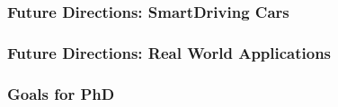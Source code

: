 \documentclass{beamer}
\begin{document}

\begin{frame}
  \frametitle{Future Directions: SmartDriving Cars}
\end{frame}



\begin{frame}
  \frametitle{Future Directions: Real World Applications}
\end{frame}



\begin{frame}
  \frametitle{Goals for PhD}
\end{frame}


\end{document}
